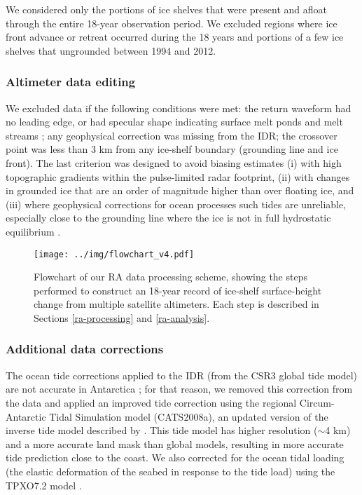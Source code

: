 We considered only the portions of ice shelves that were present and afloat through the entire 18-year observation period. We excluded regions where ice front advance or retreat occurred during the 18 years and portions of a few ice shelves that ungrounded between 1994 and 2012.

\subsubsection{Altimeter data editing}

We excluded data if the following conditions were met: the return waveform had no leading edge, or had specular shape indicating surface melt ponds and melt streams \parencite{Phillips1998}; any geophysical correction was missing from the IDR; the crossover point was less than 3 km from any ice-shelf boundary (grounding line and ice front). The last criterion was designed to avoid biasing estimates (i) with high topographic gradients within the pulse-limited radar footprint, (ii) with changes in grounded ice that are an order of magnitude higher than over floating ice, and (iii) where geophysical corrections for ocean processes such tides are unreliable, especially close to the grounding line where the ice is not in full hydrostatic equilibrium \parencite{Fricker2006}.


\begin{figure}[!ht]
  \texttt{[image: ../img/flowchart\_v4.pdf]}
  \caption{Flowchart of our RA data processing scheme, showing the steps performed to construct an 18-year record of ice-shelf surface-height change from multiple satellite altimeters. Each step is described in Sections \ref{ra-processing} and \ref{ra-analysis}.}
  \label{c2f2}
\end{figure}

\subsubsection{Additional data corrections}

The ocean tide corrections applied to the IDR (from the CSR3 global tide model) are not accurate in Antarctica \parencite{King2005}; for that reason, we removed this correction from the data and applied an improved tide correction using the regional Circum-Antarctic Tidal Simulation model (CATS2008a), an updated version of the inverse tide model described by \parencite{Padman2002}. This tide model has higher resolution ($\sim$4 km) and a more accurate land mask than global models, resulting in more accurate tide prediction close to the coast. We also corrected for the ocean tidal loading (the elastic deformation of the seabed in response to the tide load) using the TPXO7.2 model \parencite{Egbert2002}.


